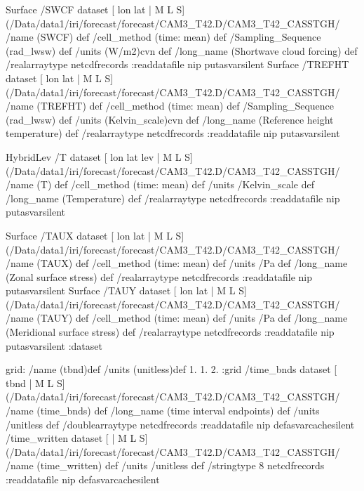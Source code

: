\begin{ingrid}
Surface /SWCF{
dataset
[ lon lat | M L S] (/Data/data1/iri/forecast/forecast/CAM3_T42.D/CAM3_T42_CASSTGH/%
/name (SWCF) def
 /cell_method (time: mean) def
 /Sampling_Sequence (rad_lwsw) def
 /units (W/m2)cvn def
 /long_name (Shortwave cloud forcing) def
 /realarraytype netcdfrecords :readdatafile
nip
}putasvarsilent
Surface /TREFHT{
dataset
[ lon lat | M L S] (/Data/data1/iri/forecast/forecast/CAM3_T42.D/CAM3_T42_CASSTGH/%
/name (TREFHT) def
 /cell_method (time: mean) def
 /Sampling_Sequence (rad_lwsw) def
 /units (Kelvin_scale)cvn def
 /long_name (Reference height temperature) def
 /realarraytype netcdfrecords :readdatafile
nip
}putasvarsilent

HybridLev /T{
dataset
[ lon lat lev | M L S] (/Data/data1/iri/forecast/forecast/CAM3_T42.D/CAM3_T42_CASSTGH/%
/name (T) def
 /cell_method (time: mean) def
 /units /Kelvin_scale def
 /long_name (Temperature) def
 /realarraytype netcdfrecords :readdatafile
nip
}putasvarsilent

Surface /TAUX{
dataset
[ lon lat | M L S] (/Data/data1/iri/forecast/forecast/CAM3_T42.D/CAM3_T42_CASSTGH/%
/name (TAUX) def
 /cell_method (time: mean) def
 /units /Pa def
 /long_name (Zonal surface stress) def
 /realarraytype netcdfrecords :readdatafile
nip
}putasvarsilent
Surface /TAUY{
dataset
[ lon lat | M L S] (/Data/data1/iri/forecast/forecast/CAM3_T42.D/CAM3_T42_CASSTGH/%
/name (TAUY) def
 /cell_method (time: mean) def
 /units /Pa def
 /long_name (Meridional surface stress) def
 /realarraytype netcdfrecords :readdatafile
nip
}putasvarsilent
:dataset
\end{ingrid}

grid:
/name (tbnd)def
/units (unitless)def
 1. 1. 2.
:grid
 /time_bnds{
dataset
[ tbnd | M L S] (/Data/data1/iri/forecast/forecast/CAM3_T42.D/CAM3_T42_CASSTGH/%
/name (time_bnds) def
 /long_name (time interval endpoints) def
 /units /unitless def
 /doublearraytype netcdfrecords :readdatafile
nip
}defasvarcachesilent
 /time_written{
dataset
[ | M L S] (/Data/data1/iri/forecast/forecast/CAM3_T42.D/CAM3_T42_CASSTGH/%
/name (time_written) def
 /units /unitless def
 /stringtype 8 netcdfrecords :readdatafile
nip
}defasvarcachesilent

